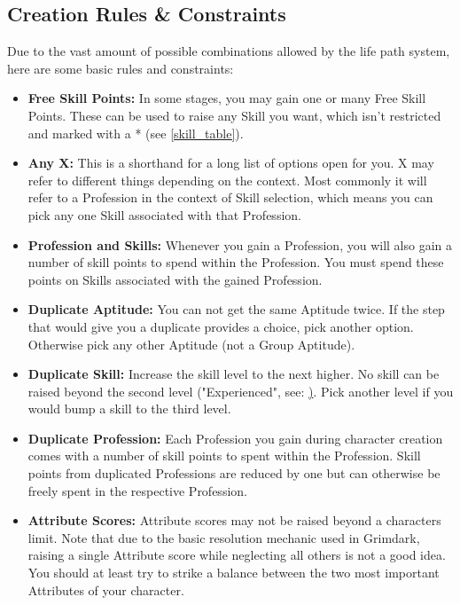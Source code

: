 \subsection{Creation Rules \& Constraints}
Due to the vast amount of possible combinations allowed by the life path system, here are some basic rules and constraints:
\begin{itemize}
	\item \textbf{Free Skill Points:} In some stages, you may gain one or many Free Skill Points. These can be used to raise any Skill you want, which isn't restricted and marked with a * (see \ref{skill_table}).
	\item \textbf{Any X:} This is a shorthand for a long list of options open for you. X may refer to different things depending on the context. Most commonly it will refer to a Profession in the context of Skill selection, which means you can pick any one Skill associated with that Profession.
	\item \textbf{Profession and Skills:} Whenever you gain a Profession, you will also gain a number of skill points to spend within the Profession. You must spend these points on Skills associated with the gained Profession.
	\item \textbf{Duplicate Aptitude:} You can not get the same Aptitude twice. If the step that would give you a duplicate provides a choice, pick another option. Otherwise pick any other Aptitude (not a Group Aptitude).
	\item \textbf{Duplicate Skill:} Increase the skill level to the next higher. No skill can be raised beyond the second level ("Experienced", see: \href{skill_level}). Pick another level if you would bump a skill to the third level.
	\item \textbf{Duplicate Profession:} Each Profession you gain during character creation comes with a number of skill points to spent within the Profession. Skill points from duplicated Professions are reduced by one but can otherwise be freely spent in the respective Profession.
	\item \textbf{Attribute Scores:} Attribute scores may not be raised beyond a characters limit. Note that due to the basic resolution mechanic used in Grimdark, raising a single Attribute score while neglecting all others is not a good idea. You should at least try to strike a balance between the two most important Attributes of your character.

\end{itemize}

